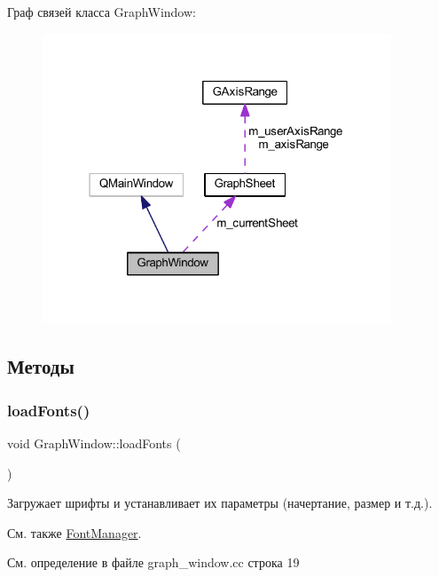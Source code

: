 Граф связей класса Graph\+Window\+:\nopagebreak
\begin{figure}[H]
\begin{center}
\leavevmode
\includegraphics[width=295pt]{class_graph_window__coll__graph}
\end{center}
\end{figure}


\subsection{Методы}
\hypertarget{class_graph_window_ad4d4842869a043556a275ba06acd816b}{}\label{class_graph_window_ad4d4842869a043556a275ba06acd816b} 
\subsubsection{\texorpdfstring{load\+Fonts()}{loadFonts()}}
{\footnotesize\ttfamily void Graph\+Window\+::load\+Fonts (\begin{DoxyParamCaption}{ }\end{DoxyParamCaption})\hspace{0.3cm}{\ttfamily [private]}}



Загружает шрифты и устанавливает их параметры (начертание, размер и т.\+д.). 

\begin{DoxySeeAlso}{См. также}
\hyperlink{class_font_manager}{Font\+Manager}. 
\end{DoxySeeAlso}


См. определение в файле graph\+\_\+window.\+cc строка 19


